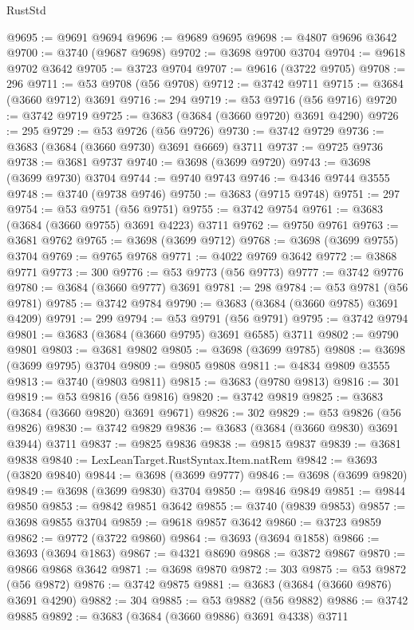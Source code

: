\begin{lexlean}{RustStd}
\begin{coremodule}
{\begin{coremodule}
{{{{{{{{{{{{{{{{{{{{{{{{{{{{{{{{{{{{{{{{{{{{{{{@9695 := @9691 @9694
@9696 := @9689 @9695
@9698 := @4807 @9696 @3642
@9700 := @3740 (@9687 @9698)
@9702 := @3698 @9700 @3704
@9704 := @9618 @9702 @3642
@9705 := @3723 @9704
@9707 := @9616 (@3722 @9705)
@9708 := 296
@9711 := @53 @9708 (@56 @9708)
@9712 := @3742 @9711
@9715 := @3684 (@3660 @9712) @3691
@9716 := 294
@9719 := @53 @9716 (@56 @9716)
@9720 := @3742 @9719
@9725 := @3683 (@3684 (@3660 @9720) @3691 @4290)
@9726 := 295
@9729 := @53 @9726 (@56 @9726)
@9730 := @3742 @9729
@9736 := @3683 (@3684 (@3660 @9730) @3691 @6669) @3711
@9737 := @9725 @9736
@9738 := @3681 @9737
@9740 := @3698 (@3699 @9720)
@9743 := @3698 (@3699 @9730) @3704
@9744 := @9740 @9743
@9746 := @4346 @9744 @3555
@9748 := @3740 (@9738 @9746)
@9750 := @3683 (@9715 @9748)
@9751 := 297
@9754 := @53 @9751 (@56 @9751)
@9755 := @3742 @9754
@9761 := @3683 (@3684 (@3660 @9755) @3691 @4223) @3711
@9762 := @9750 @9761
@9763 := @3681 @9762
@9765 := @3698 (@3699 @9712)
@9768 := @3698 (@3699 @9755) @3704
@9769 := @9765 @9768
@9771 := @4022 @9769 @3642
@9772 := @3868 @9771
@9773 := 300
@9776 := @53 @9773 (@56 @9773)
@9777 := @3742 @9776
@9780 := @3684 (@3660 @9777) @3691
@9781 := 298
@9784 := @53 @9781 (@56 @9781)
@9785 := @3742 @9784
@9790 := @3683 (@3684 (@3660 @9785) @3691 @4209)
@9791 := 299
@9794 := @53 @9791 (@56 @9791)
@9795 := @3742 @9794
@9801 := @3683 (@3684 (@3660 @9795) @3691 @6585) @3711
@9802 := @9790 @9801
@9803 := @3681 @9802
@9805 := @3698 (@3699 @9785)
@9808 := @3698 (@3699 @9795) @3704
@9809 := @9805 @9808
@9811 := @4834 @9809 @3555
@9813 := @3740 (@9803 @9811)
@9815 := @3683 (@9780 @9813)
@9816 := 301
@9819 := @53 @9816 (@56 @9816)
@9820 := @3742 @9819
@9825 := @3683 (@3684 (@3660 @9820) @3691 @9671)
@9826 := 302
@9829 := @53 @9826 (@56 @9826)
@9830 := @3742 @9829
@9836 := @3683 (@3684 (@3660 @9830) @3691 @3944) @3711
@9837 := @9825 @9836
@9838 := @9815 @9837
@9839 := @3681 @9838
@9840 := LexLeanTarget.RustSyntax.Item.natRem
@9842 := @3693 (@3820 @9840)
@9844 := @3698 (@3699 @9777)
@9846 := @3698 (@3699 @9820)
@9849 := @3698 (@3699 @9830) @3704
@9850 := @9846 @9849
@9851 := @9844 @9850
@9853 := @9842 @9851 @3642
@9855 := @3740 (@9839 @9853)
@9857 := @3698 @9855 @3704
@9859 := @9618 @9857 @3642
@9860 := @3723 @9859
@9862 := @9772 (@3722 @9860)
@9864 := @3693 (@3694 @1858)
@9866 := @3693 (@3694 @1863)
@9867 := @4321 @8690
@9868 := @3872 @9867
@9870 := @9866 @9868 @3642
@9871 := @3698 @9870
@9872 := 303
@9875 := @53 @9872 (@56 @9872)
@9876 := @3742 @9875
@9881 := @3683 (@3684 (@3660 @9876) @3691 @4290)
@9882 := 304
@9885 := @53 @9882 (@56 @9882)
@9886 := @3742 @9885
@9892 := @3683 (@3684 (@3660 @9886) @3691 @4338) @3711
}}}}}}}}}}}}}}}}}}}}}}}}}}}}}}}}}}}}}}}}}}}}}}}
\end{coremodule}}
\end{coremodule}
\end{lexlean}
